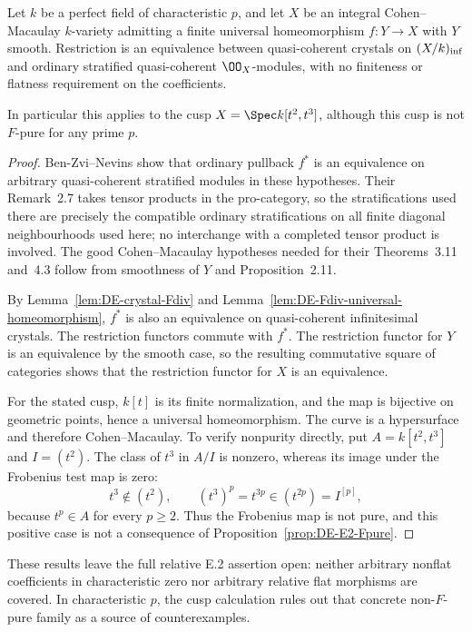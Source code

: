 \begin{proposition}\label{prop:DE-E2-cusps}
Let $k$ be a perfect field of characteristic $p$, and let $X$ be an integral Cohen--Macaulay $k$-variety admitting a finite universal homeomorphism $f:Y\to X$ with $Y$ smooth.  Restriction is an equivalence between quasi-coherent crystals on $(X/k)_{\rm inf}$ and ordinary stratified quasi-coherent $\OO_X$-modules, with no finiteness or flatness requirement on the coefficients.

In particular this applies to the cusp $X=\Spec k[t^2,t^3]$, although this cusp is not $F$-pure for any prime $p$.
\end{proposition}
\begin{proof}
Ben-Zvi--Nevins \cite[Proposition~2.11, Theorem~3.11, Theorem~4.3 and Remark~4.5]{BenZviNevins2004} show that ordinary pullback $f^*$ is an equivalence on arbitrary quasi-coherent stratified modules in these hypotheses.  Their Remark~2.7 takes tensor products in the pro-category, so the stratifications used there are precisely the compatible ordinary stratifications on all finite diagonal neighbourhoods used here; no interchange with a completed tensor product is involved.  The good Cohen--Macaulay hypotheses needed for their Theorems~3.11 and~4.3 follow from smoothness of $Y$ and Proposition~2.11.

By Lemma~\ref{lem:DE-crystal-Fdiv} and Lemma~\ref{lem:DE-Fdiv-universal-homeomorphism}, $f^*$ is also an equivalence on quasi-coherent infinitesimal crystals.  The restriction functors commute with $f^*$.  The restriction functor for $Y$ is an equivalence by the smooth case, so the resulting commutative square of categories shows that the restriction functor for $X$ is an equivalence.

For the stated cusp, $k[t]$ is its finite normalization, and the map is bijective on geometric points, hence a universal homeomorphism.  The curve is a hypersurface and therefore Cohen--Macaulay.  To verify nonpurity directly, put $A=k[t^2,t^3]$ and $I=(t^2)$.  The class of $t^3$ in $A/I$ is nonzero, whereas its image under the Frobenius test map is zero:
\[
       t^3\notin(t^2),\qquad
       (t^3)^p=t^{3p}\in(t^{2p})=I^{[p]},
\]
because $t^p\in A$ for every $p\geq2$.  Thus the Frobenius map is not pure, and this positive case is not a consequence of Proposition~\ref{prop:DE-E2-Fpure}.
\end{proof}

These results leave the full relative E.2 assertion open: neither arbitrary nonflat coefficients in characteristic zero nor arbitrary relative flat morphisms are covered.  In characteristic $p$, the cusp calculation rules out that concrete non-$F$-pure family as a source of counterexamples.
